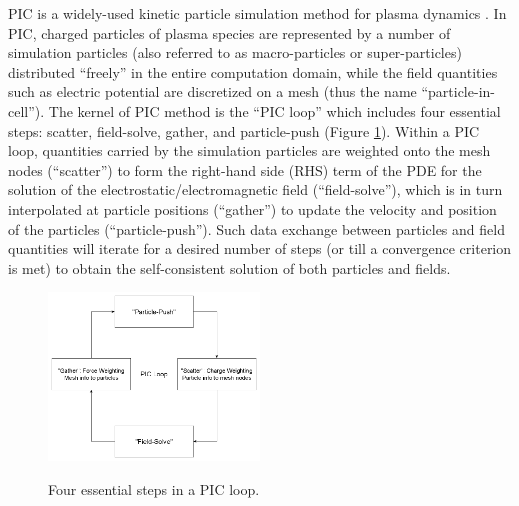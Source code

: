 \documentclass{siamart171218}
\begin{document}
PIC is a widely-used kinetic particle simulation method for plasma dynamics
\cite{Birdsall_Langdon_2005,Hockney_Eastwood_1988}.
In PIC, charged particles of plasma species are represented
by a number of simulation particles
(also referred to as macro-particles or super-particles)
distributed ``freely'' in the entire computation domain,
while the field quantities such as electric potential are discretized on a mesh
(thus the name ``particle-in-cell'').
The kernel of PIC method is the ``PIC loop''
which includes four essential steps: scatter, field-solve, gather, and particle-push
(Figure \ref{fig:picloop}).
Within a PIC loop, quantities carried by the simulation particles
are weighted onto the mesh nodes (``scatter'') to form the right-hand side (RHS) term
of the PDE for the solution of the electrostatic/electromagnetic field (``field-solve''),
which is in turn interpolated at particle positions (``gather'')
to update the velocity and position of the particles (``particle-push'').
Such data exchange between particles and field quantities
will iterate for a desired number of steps
(or till a convergence criterion is met)
to obtain the self-consistent solution of both particles and fields.

\begin{figure}[ht!]
\centering
{\includegraphics[width=0.5\textwidth]{flowchart_pic_loop.png}}
\caption{Four essential steps in a PIC loop.}
\label{fig:picloop}
\end{figure}
\end{document}
